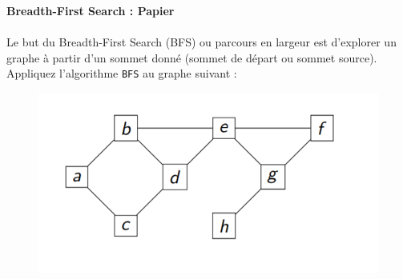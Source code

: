 \begin{Exercice}[5 minutes]\textbf{Breadth-First Search : Papier
}\\
\\
	Le but du Breadth-First Search (BFS) ou parcours en largeur est d'explorer un graphe à partir d’un sommet donné (sommet de départ ou sommet source). \\

	Appliquez l’algorithme \lstinline{BFS} au graphe suivant :\\

	\begin{figure}[h!]
        		\centering
       	 	\includegraphics[]{resources/exerciceBFS.png}
	\end{figure}



\end{Exercice}
